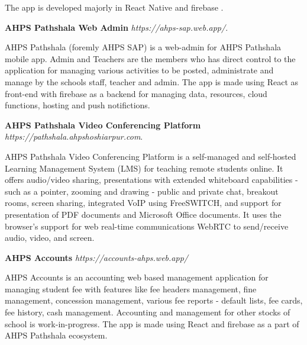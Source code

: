 \documentclass[margin,line]{res}
\begin{document}
\begin{resume}
The app is developed majorly in React Native and firebase .

\textbf{AHPS Pathshala Web Admin} {\em https://ahps-sap.web.app/}.

AHPS Pathshala (foremly AHPS SAP) is a web-admin for AHPS Pathshala mobile app. Admin and Teachers are the members who has direct control to the application for managing various activities to be posted, administrate and manage by the schools staff, teacher and admin. The app is made using React as front-end with firebase as a backend for managing data, resources, cloud functions, hosting and push notifictions.

\textbf{AHPS Pathshala Video Conferencing Platform} {\em https://pathshala.ahpshoshiarpur.com}.

AHPS Pathshala Video Conferencing Platform is a self-managed and self-hosted Learning Management System (LMS) for teaching remote students online.  It offers audio/video sharing, presentations with extended whiteboard capabilities - such as a pointer, zooming and drawing - public and private chat, breakout rooms, screen sharing, integrated VoIP using FreeSWITCH, and support for presentation of PDF documents and Microsoft Office documents. It uses the browser's support for web real-time communications WebRTC to send/receive audio, video, and screen. 

\textbf{AHPS Accounts} {\em https://accounts-ahps.web.app/}

AHPS Accounts is an accounting web based management application for managing student fee with features like fee headers management, fine management, concession management, various fee reports - default lists, fee cards, fee history, cash management. Accounting and management for other stocks of school is work-in-progress. The app is made using React and firebase as a part of AHPS Pathshala ecosystem.

%
%
%


\end{resume}
\end{document}
